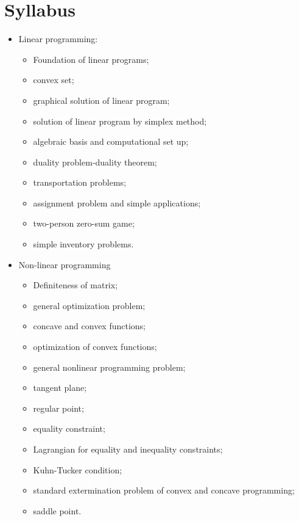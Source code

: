 \documentclass[../main-sheet.tex]{subfiles}
\begin{document}
\chapter*{Syllabus}
\begin{itemize}
    \item Linear programming:
          \begin{itemize}
              \item Foundation of linear programs;
              \item convex set;
              \item graphical solution of linear program;
              \item solution of linear program by simplex method;
              \item algebraic basis and computational set up;
              \item duality problem-duality theorem;
              \item transportation problems;
              \item assignment problem and simple applications;
              \item two-person zero-sum game;
              \item simple inventory problems.
          \end{itemize}
    \item Non-linear programming
          \begin{itemize}
              \item Definiteness of matrix;
              \item general optimization problem;
              \item concave and convex functions;
              \item optimization of convex functions;
              \item general nonlinear programming problem;
              \item tangent plane;
              \item regular point;
              \item equality constraint;
              \item Lagrangian for equality and inequality constraints;
              \item Kuhn-Tucker condition;
              \item standard extermination problem of convex and concave programming;
              \item saddle point.
          \end{itemize}
\end{itemize}
\end{document}
